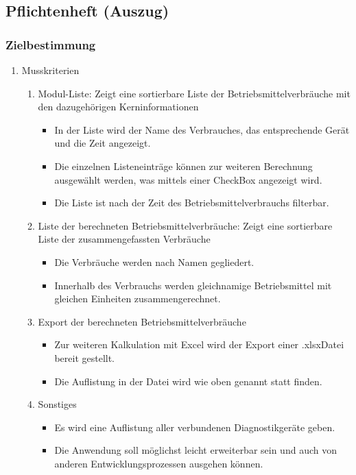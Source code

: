 \subsection{Pflichtenheft (Auszug)}
\label{app:Pflichtenheft}

\subsubsection*{Zielbestimmung}
\begin{enumerate}[itemsep=0em,partopsep=0em,parsep=0em,topsep=0em]
	\item Musskriterien %
	\begin{enumerate}
		\item Modul-Liste: Zeigt eine sortierbare Liste der Betriebsmittelverbräuche mit den dazugehörigen Kerninformationen
		\begin{itemize}
			\item In der Liste wird der Name des Verbrauches, das entsprechende Gerät und die Zeit angezeigt.
			\item Die einzelnen Listeneinträge können zur weiteren Berechnung ausgewählt werden, was mittels einer CheckBox angezeigt wird.
			\item Die Liste ist nach der Zeit des Betriebsmittelverbrauchs filterbar.
		\end{itemize}
		\item Liste der berechneten Betriebsmittelverbräuche: Zeigt eine sortierbare Liste der zusammengefassten Verbräuche
		\begin{itemize}
			\item Die Verbräuche werden nach Namen gegliedert.
			\item Innerhalb des Verbrauchs werden gleichnamige Betriebsmittel mit gleichen Einheiten zusammengerechnet.
		\end{itemize}
		\item Export der berechneten Betriebsmittelverbräuche
		\begin{itemize}
			\item Zur weiteren Kalkulation mit Excel wird der Export einer \glqq .xlsx\grqq \space Datei bereit gestellt.
			\item Die Auflistung in der Datei wird wie oben genannt statt finden.
		\end{itemize}
		\item Sonstiges
		\begin{itemize}
			\item Es wird eine Auflistung aller verbundenen Diagnostikgeräte geben.
			\item Die Anwendung soll möglichst leicht erweiterbar sein und auch von anderen Entwicklungsprozessen ausgehen können.
		\end{itemize}
	\end{enumerate}
\end{enumerate}
